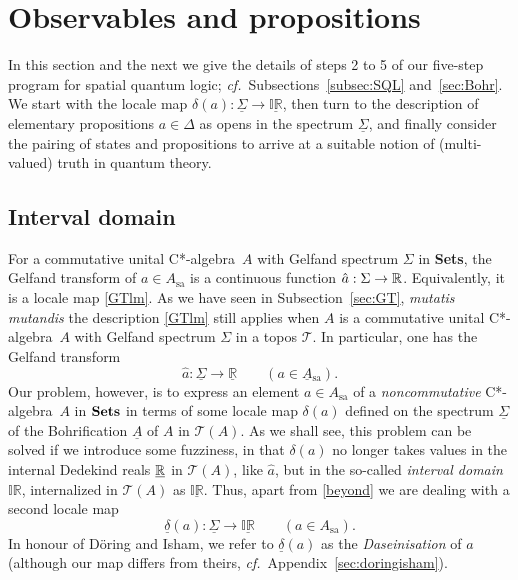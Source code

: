 \documentclass[11pt]{article}
\newcommand{\IR}{\mathbb{IR}}
\newcommand{\uIR}{\underline{\mathbb{IR}}}
\newcommand{\beq}{\begin{equation}}
\newcommand{\eeq}{\end{equation}}
\newcommand{\Sets}{\mbox{\textbf{Sets}}}
\newcommand{\ca}{C*-algebra} \newcommand{\jba}{JB-algebra}
\newcommand{\raw}{\rightarrow} \newcommand{\rat}{\mapsto}
\newcommand{\er}{\eqref}
\newcommand{\dl}{\delta} \newcommand{\Dl}{\Delta}
\newcommand{\Sg}{\Sigma} \newcommand{\ta}{\tau} \newcommand{\ph}{\phi}
\newcommand{\CT}{{\mathcal T}} \newcommand{\CV}{{\mathcal V}}
\newcommand{\alg}[1]{\ensuremath{#1}}
\newcommand{\functor}[1]{\ensuremath{\underline{#1}}}
\newcommand{\asstopos}{\ensuremath{\mathcal{T}}}
\newcommand{\sa}{\ensuremath{_{\mathrm{sa}}}}
\newcommand{\uA}{\underline{A}}
\newcommand{\TA}{\mathcal{T}(A)}
\newcommand{\ulS}{\functor{\Sigma}}
\newcommand{\ulR}{\underline{\mathbb{R}}}
\renewcommand{\TA}{\asstopos(\alg{A})}
\begin{document}
\section{Observables and propositions}
\label{sec:interpretationofquantumphysics}

In this section and the next we give the details of  steps 2 to 5 of
our five-step program for spatial quantum logic; {\it cf.}\
Subsections~\ref{subsec:SQL} and~\ref{sec:Bohr}. We start with the
locale map  $\dl(a):\ulS\raw\uIR$, then turn to the description of
elementary propositions $a\in\Dl$ as opens in the spectrum $\ulS$, and
finally consider the pairing of states and propositions to arrive at a
suitable notion of (multi-valued) truth in quantum theory.

\subsection{Interval domain}\label{subsec:ID}

For a commutative unital \ca\ $A$ with Gelfand spectrum $\Sg$ in
\Sets, the Gelfand transform of $a\in A\sa$ is a continuous function
$\hat{a}:\Sg\raw\R$. Equivalently, it is a locale map \er{GTlm}. As we
have seen  in Subsection~\ref{sec:GT}, {\it mutatis mutandis} the
description \er{GTlm} still applies when $A$ is a commutative unital
\ca\ $A$ with Gelfand spectrum $\Sg$  in a topos $\CT$. In particular,
one has the Gelfand transform
\beq
  \hat{a}:  \ulS\raw \ulR \qquad (a\in \uA\sa).\label{beyond}
\eeq
Our problem, however, is to express an element $a\in A\sa$ of a {\it
noncommutative} \ca\ $A$ in $\Sets$ in terms of some locale map
$\dl(a)$ defined on the spectrum $\ulS$ of the Bohrification $\uA$
of $A$ in $\TA$. As we shall see, this problem can be solved if we
introduce some fuzziness, in that $\dl(a)$ no longer takes values
in the internal Dedekind reals $\underline{{\mathbb R}}$ in $\TA$, like
$\hat{a}$, but in the so-called {\it interval domain} $\IR$,
internalized in $\TA$ as $\underline{\IR}$. Thus, apart from
\er{beyond} we are dealing with a second locale map
\beq
\underline{\dl}(a):  \ulS\raw \underline{\IR} \qquad (a\in A\sa).\label{Da1}
\eeq
In honour of D\"{o}ring and Isham, we refer to $\underline{\dl}(a)$ as the {\it
Daseinisation} of $a$ (although our map differs from theirs, {\it
cf.}\ Appendix~\ref{sec:doringisham}).
\end{document}
